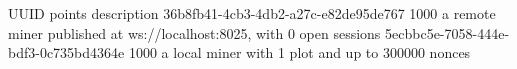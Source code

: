\begin{shellbox}\begin{ttlst}
                UUID                 points                                description                             
36b8fb41-4cb3-4db2-a27c-e82de95de767   1000   a remote miner published at ws://localhost:8025, with 0 open sessions
5ecbbc5e-7058-444e-bdf3-0c735bd4364e   1000   a local miner with 1 plot and up to 300000 nonces                    
\end{ttlst}\end{shellbox}
